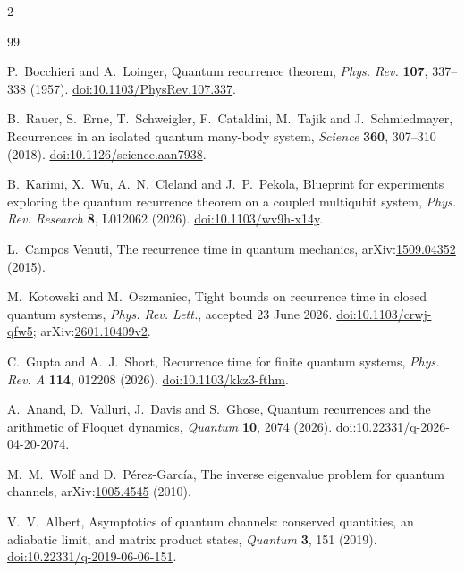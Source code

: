 \documentclass[10pt]{article}
\theoremstyle{definition}
\begin{document}
\begin{multicols}{2}
\begin{thebibliography}{99}
\scriptsize
\setlength{\itemsep}{0.08em}

P.~Bocchieri and A.~Loinger,
Quantum recurrence theorem,
\emph{Phys. Rev.} \textbf{107}, 337--338 (1957).
\href{https://doi.org/10.1103/PhysRev.107.337}
{doi:10.1103/PhysRev.107.337}.

B.~Rauer, S.~Erne, T.~Schweigler, F.~Cataldini, M.~Tajik and
J.~Schmiedmayer,
Recurrences in an isolated quantum many-body system,
\emph{Science} \textbf{360}, 307--310 (2018).
\href{https://doi.org/10.1126/science.aan7938}
{doi:10.1126/science.aan7938}.

B.~Karimi, X.~Wu, A.~N.~Cleland and J.~P.~Pekola,
Blueprint for experiments exploring the quantum recurrence theorem on a
coupled multiqubit system,
\emph{Phys. Rev. Research} \textbf{8}, L012062 (2026).
\href{https://doi.org/10.1103/wv9h-x14y}
{doi:10.1103/wv9h-x14y}.

L.~Campos Venuti,
The recurrence time in quantum mechanics,
arXiv:\href{https://arxiv.org/abs/1509.04352}{1509.04352} (2015).

M.~Kotowski and M.~Oszmaniec,
Tight bounds on recurrence time in closed quantum systems,
\emph{Phys. Rev. Lett.}, accepted 23 June 2026.
\href{https://doi.org/10.1103/crwj-qfw5}{doi:10.1103/crwj-qfw5};
arXiv:\href{https://arxiv.org/abs/2601.10409}{2601.10409v2}.

C.~Gupta and A.~J.~Short,
Recurrence time for finite quantum systems,
\emph{Phys. Rev. A} \textbf{114}, 012208 (2026).
\href{https://doi.org/10.1103/kkz3-fthm}{doi:10.1103/kkz3-fthm}.

A.~Anand, D.~Valluri, J.~Davis and S.~Ghose,
Quantum recurrences and the arithmetic of Floquet dynamics,
\emph{Quantum} \textbf{10}, 2074 (2026).
\href{https://doi.org/10.22331/q-2026-04-20-2074}
{doi:10.22331/q-2026-04-20-2074}.

M.~M.~Wolf and D.~P\'erez-Garc\'ia,
The inverse eigenvalue problem for quantum channels,
arXiv:\href{https://arxiv.org/abs/1005.4545}{1005.4545} (2010).

V.~V.~Albert,
Asymptotics of quantum channels: conserved quantities, an adiabatic limit,
and matrix product states,
\emph{Quantum} \textbf{3}, 151 (2019).
\href{https://doi.org/10.22331/q-2019-06-06-151}
{doi:10.22331/q-2019-06-06-151}.


\end{thebibliography}
\end{multicols}
\end{document}
